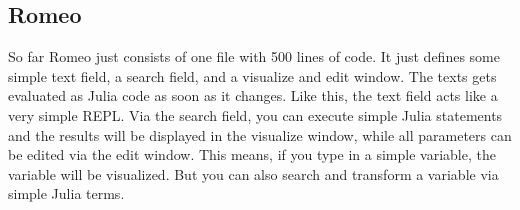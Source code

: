 \subsection{Romeo}

So far Romeo just consists of one file with 500 lines of code. It just defines some simple text field, a search field, and a visualize and edit window.
The texts gets evaluated as Julia code as soon as it changes. Like this, the text field acts like a very simple \ac{REPL}.
Via the search field, you can execute simple Julia statements and the results will be displayed in the visualize window, while all parameters can be edited via the edit window.
This means, if you type in a simple variable, the variable will be visualized. But you can also search and transform a variable via simple Julia terms.